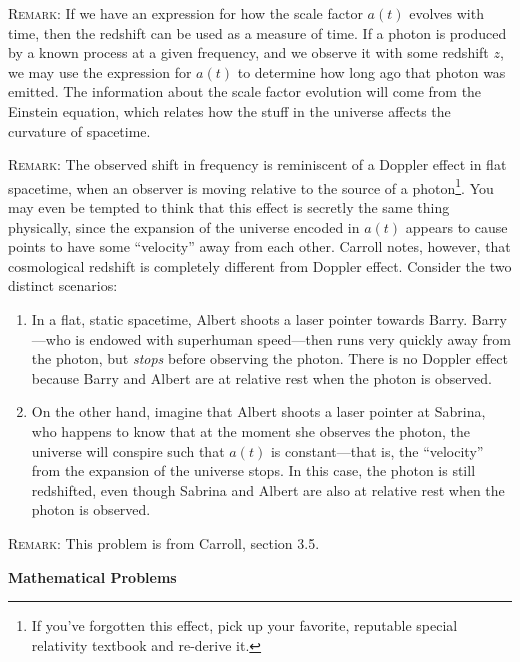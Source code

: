\documentclass[12pt]{article}
\numberwithin{equation}{section}    %
\begin{document}
\textsc{Remark}: If we have an expression for how the scale factor $a(t)$ evolves with time, then the redshift can be used as a measure of time. If a photon is produced by a known process at a given frequency, and we observe it with some redshift $z$, we may use the expression for $a(t)$ to determine how long ago that photon was emitted. The information about the scale factor evolution will come from the Einstein equation, which relates how the stuff in the universe affects the curvature of spacetime. 

\textsc{Remark}: The observed shift in frequency is reminiscent of a Doppler effect in flat spacetime, when an observer is moving relative to the source of a photon\footnote{If you've forgotten this effect, pick up your favorite, reputable special relativity textbook and re-derive it.}. You may even be tempted to think that this effect is secretly the same thing physically, since the expansion of the universe encoded in $a(t)$ appears to cause points to have some ``velocity'' away from each other. Carroll notes, however, that cosmological redshift is completely different from Doppler effect. Consider the two distinct scenarios:
\begin{enumerate}
	\item In a flat, static spacetime, Albert shoots a laser pointer towards Barry. Barry---who is endowed with superhuman speed---then runs very quickly away from the photon, but \emph{stops} before observing the photon. There is no Doppler effect because Barry and Albert are at relative rest when the photon is observed.
	\item On the other hand, imagine that Albert shoots a laser pointer at Sabrina, who happens to know that at the moment she observes the photon, the universe will conspire such that $a(t)$ is constant---that is, the ``velocity'' from the expansion of the universe stops. In this case, the photon is still redshifted, even though Sabrina and Albert are also at relative rest when the photon is observed.
\end{enumerate}

\textsc{Remark}: This problem is from Carroll, section 3.5.


\vspace{2em}
{\Large\textbf{\textsf{Mathematical Problems}}}
\end{document}
